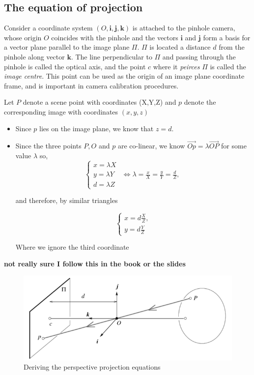 \documentclass{article}
\begin{document}
\subsection{The equation of projection}

Consider a coordinate system $(O,\mathbf{i}, \mathbf{j} , \mathbf{k} )$ is attached to the pinhole camera, whose origin $O$ coincides with the pinhole and the vectors $\mathbf{i} $ and $\mathbf{j} $ form a basis for a vector plane parallel to the image plane $\Pi$. $\Pi$ is located a distance $d$ from the pinhole along vector $\mathbf{k}$. The line perpendicular to $\Pi $ and passing through the pinhole is called the optical axis, and the point $c$ where it \textit{peirces} $\Pi$ is called the \textit{image centre}. This point can be used as the origin of an image plane coordinate frame, and is important in camera calibration procedures.

Let $P$ denote a scene point with coordinates (X,Y,Z) and $p$ denote the corresponding image with coordinates $(x,y,z)$
\begin{itemize}
  \item Since $p$ lies on the image plane, we know that $z=d$.
  \item Since the three points $P,O$ and $p$ are co-linear, we know $\vec{Op} = \lambda \vec{OP}$ for some value $\lambda$ so,
        \[
        \begin{cases}
          x = \lambda X \\
          y = \lambda Y & \Longleftrightarrow \lambda = \frac{x}{X} = \frac{y}{Y} = \frac{d}{Z}, \\
          d = \lambda Z
        \end{cases}
        \]

        and therefore, by similar triangles

        \[
        \begin{cases}
          x = d \frac{X}{Z}, \\
          y = d \frac{Y}{Z}
        \end{cases}
        \]

        Where we ignore the third coordinate
\end{itemize}
\textbf{not really sure I follow this in the book or the slides }



\begin{figure}[ht]
  \centering
  \includegraphics[scale=0.6]{figures/perspectiveproof.png}
  \caption{\label{fig:perspective-proof} Deriving the perspective projection equations }
\end{figure}
\end{document}
